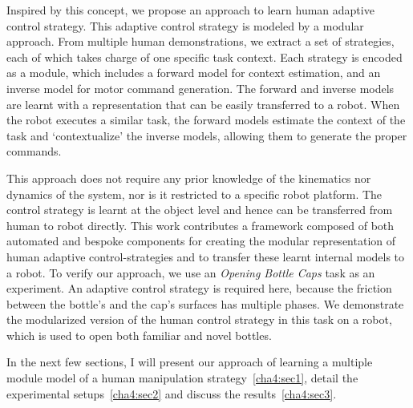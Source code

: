 
Inspired by this concept, we propose an approach to learn human
adaptive control strategy. This adaptive control strategy is modeled by a modular
approach.
From multiple human demonstrations, we extract a set of strategies,
each of which takes charge of one specific task context.
Each strategy is encoded as a module, which includes a forward model for context
estimation, and an inverse model for motor command generation.
The forward and inverse models are learnt with a representation
that can be easily transferred to a
robot. When the robot executes a similar task, the forward models
estimate the context of the task and
`contextualize' the inverse models, allowing them to generate the proper commands.


This approach does not require any prior knowledge of the kinematics nor dynamics of the system, nor is it restricted to a specific robot platform. The control strategy is learnt at the object level and hence can be transferred from human to robot directly.
This work contributes a framework composed of both automated and bespoke components for creating the modular representation of
human adaptive control-strategies
and to transfer these learnt internal models to a robot. To verify our
approach, we use an \emph{Opening Bottle Caps} task as an experiment. An adaptive control strategy is required here, because the
friction between the bottle's and the cap's surfaces has multiple phases. We demonstrate the modularized version of the human control
strategy in this task on a robot, which is used to open both familiar and novel bottles.

In the next few sections, I will present our approach of learning a multiple module model of a human manipulation strategy~\ref{cha4:sec1}, detail the experimental setups~\ref{cha4:sec2} and discuss the results~\ref{cha4:sec3}.




